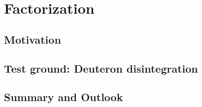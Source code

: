 \cleardoublepage
\chapter{Factorization}

	\section{Motivation}

	\section{Test ground: Deuteron disintegration}

	\section{Summary and Outlook}